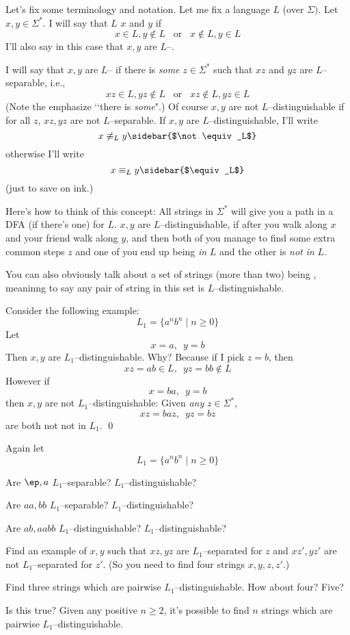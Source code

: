 \newpage
Let's fix some terminology and notation.
Let me fix a language $L$ (over $\Sigma)$.
Let $x, y \in \Sigma^*$.
I will say that $L$  $x$ and $y$ if
\[
x \in L, y \not\in L \,\,\, \text{ or } \,\,\, x \not\in L, y \in L  
\]
I'll also say in this case that $x,y$ are $L$--.

I will say that $x,y$ are $L$-- if
there is \textit{some} $z \in \Sigma^*$ such that
$xz$ and $yz$ are $L$--separable, i.e.,
\[
xz \in L, yz \not\in L \,\,\, \text{ or } \,\,\, xz \not\in L, yz \in L  
\]
(Note the emphasize \lq\lq there is \textit{some}".)
Of course $x,y$ are not $L$--distinguishable if
for all $z$, $xz,yz$ are not $L$--separable.
If $x,y$ are $L$--distinguishable, I'll write 
\[
x \not\equiv_L y \sidebar{$\not\equiv_L$}\index{$\not\equiv_L$}
\]
otherwise I'll write
\[
x \equiv_L y \sidebar{$\equiv_L$}\index{$\equiv_L$}
\]
(just to save on ink.)

Here's how to think of this concept:
All strings in $\Sigma^*$ will give you a path in a DFA (if there's one) for $L$.
$x,y$ are $L$--distinguishable, if after you walk along $x$ and your friend walk along $y$,
and then both of you manage to find some extra common steps $z$ and one of
you end up being \textit{in} $L$ and the other is \textit{not in} $L$.

You can also obviously talk about a set of strings (more than two) being
, meaninng to say
any pair of string in this set is $L$--distinguishable.

\newpage
\begin{eg}
Consider the following example:
\[
L_1 = \{a^n b^n \mid n \geq 0\}
\]
Let
\[
x = a, \,\,\, y = b
\]
Then $x,y$ are $L_1$--distinguishable. Why?
Because if I pick $z = b$,
then
\[
xz = ab \in L, \,\,\, yz = bb \not\in L
\]
However if
\[
x = ba, \,\,\, y = b
\]
then $x,y$ are not $L_1$--distinguishable:
Given \textit{any} $z \in \Sigma^*$,
\[
xz = baz, \,\,\, yz = bz
\]
are both not not in $L_1$.
\qed
\end{eg}

\begin{ex}
  Again let
  \[
  L_1 = \{a^n b^n \mid n \geq 0\}
  \]
  \begin{tightlist}
  \item Are $\ep, a$ $L_1$--separable? $L_1$--distinguishable?
  \item Are $aa, bb$ $L_1$--separable? $L_1$--distinguishable?
  \item Are $ab, aabb$ $L_1$--distinguishable? $L_1$--distinguishable?
  \item Find an example of $x,y$ such that
    $xz, yz$ are $L_1$--separated for $z$ and
    $xz', yz'$ are not $L_1$--separated for $z'$.
    (So you need to find four strings $x,y,z,z'$.)
  \item Find three strings which are pairwise $L_1$--distinguishable.
    How about four? Five?
  \item Is this true? Given any positive $n \geq 2$,
    it's possible to find $n$ strings which are
    pairwise $L_1$--distinguishable.
  \end{tightlist}
\end{ex}


